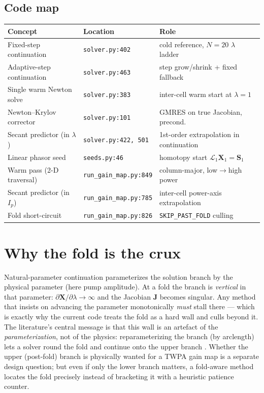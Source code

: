 \documentclass[11pt]{article}
\newcommand{\code}[1]{\texttt{\small #1}}
\newcommand{\Xv}{\mathbf{X}}
\newcommand{\Jac}{\mathbf{J}}
\begin{document}
\subsection{Code map}
\begin{center}
\small
\begin{tabular}{@{}p{4.6cm}p{4.2cm}p{5.2cm}@{}}
\toprule
\textbf{Concept} & \textbf{Location} & \textbf{Role} \\
\midrule
Fixed-step continuation & \code{solver.py:402} & cold reference, $N{=}20$ $\lambda$ ladder \\
Adaptive-step continuation & \code{solver.py:463} & step grow/shrink + fixed fallback \\
Single warm Newton solve & \code{solver.py:383} & inter-cell warm start at $\lambda{=}1$ \\
Newton--Krylov corrector & \code{solver.py:101} & GMRES on true Jacobian, precond. \\
Secant predictor (in $\lambda$) & \code{solver.py:422,\,501} & 1st-order extrapolation in continuation \\
Linear phasor seed & \code{seeds.py:46} & homotopy start $\mathcal{L}_1 \Xv_1 = \mathbf{S}_1$ \\
Warm pass (2-D traversal) & \code{run\_gain\_map.py:849} & column-major, low$\to$high power \\
Secant predictor (in $I_p$) & \code{run\_gain\_map.py:785} & inter-cell power-axis extrapolation \\
Fold short-circuit & \code{run\_gain\_map.py:826} & \code{SKIP\_PAST\_FOLD} culling \\
\bottomrule
\end{tabular}
\end{center}

\section{Why the fold is the crux}
Natural-parameter continuation parameterizes the solution branch by the physical
parameter (here pump amplitude). At a fold the branch is \emph{vertical} in that
parameter: $\partial \Xv / \partial \lambda \to \infty$ and the Jacobian
$\Jac$ becomes singular. Any method that insists on advancing the parameter
monotonically \emph{must} stall there --- which is exactly why the current code
treats the fold as a hard wall and culls beyond it. The literature's central
message is that this wall is an artefact of the \emph{parameterization}, not of
the physics: reparameterizing the branch (by arclength) lets a solver round the
fold and continue onto the upper branch \cite{Keller1977,AllgowerGeorg2003}.
Whether the upper (post-fold) branch is physically wanted for a TWPA gain map is
a separate design question; but even if only the lower branch matters, a
fold-aware method locates the fold precisely instead of bracketing it with a
heuristic patience counter.
\end{document}
